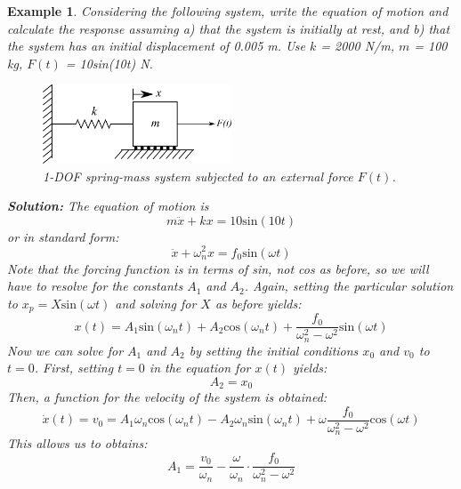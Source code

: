 \documentclass[12pt,letter]{article}
\newtheorem{ex}{Example}
\numberwithin{ex}{section} %
\newenvironment{example}{\begin{mdframed}[middlelinewidth=0.5mm]\begin{ex}\normalfont}{\end{ex}\end{mdframed}}
\numberwithin{re}{section} %
\numberwithin{vcs}{section} %
\begin{document}
\begin{example}
			Considering the following system, write the equation of motion and calculate the response assuming a) that the system is initially at rest, and b) that the system has an initial displacement of 0.005 m. Use $k$ = 2000 N/m, $m$ = 100 kg, $F(t)$ = 10sin(10t) N.
			\begin{figure}[H]
				\centering
				\includegraphics[width=0.5\textwidth]{../figures/1-DOF-spring_mass_horizontal_forced.png}
				\caption{1-DOF spring-mass system subjected to an external force $F(t)$.}
			\end{figure}
			\noindent\textbf{Solution:} The equation of motion is
			\begin{equation}
				m\ddot{x}+kx=10\text{sin}(10t)
			\end{equation}
			or in standard form:
			\begin{equation}
				\ddot{x}+\omega_n^2x=f_0\text{sin}(\omega t)
			\end{equation}							
			Note that the forcing function is in terms of sin, not cos as before, so we will have to resolve for the constants $A_1$ and $A_2$. Again, setting the particular solution to $x_p=X\text{sin}(\omega t)$ and solving for $X$ as before yields:
			\begin{equation}
				x(t) = A_1\text{sin}(\omega_n t) + A_2\text{cos}(\omega_n t) + \frac{f_0}{\omega_n^2-\omega^2}\text{sin}(\omega t)
			\end{equation}	
			Now we can solve for $A_1$ and $A_2$ by setting the initial conditions $x_0$ and $v_0$ to $t=0$. First, setting $t=0$ in the equation for $x(t)$ yields:
			\begin{equation}
				A_2 = x_0
			\end{equation}	
			Then, a function for the velocity of the system is obtained: 
			\begin{equation}
				\dot{x}(t) = v_0 = A_1\omega_n\text{cos}(\omega_n t) - A_2\omega_n\text{sin}(\omega_n t) + \omega\frac{f_0}{\omega_n^2-\omega^2}\text{cos}(\omega t)
			\end{equation}				
			This allows us to obtains:
			\begin{equation}
				A_1 = \frac{v_0}{\omega_n}-\frac{\omega}{\omega_n}\cdot \frac{f_0}{\omega_n^2-\omega^2}

\end{equation}
\end{example}
\end{document}
